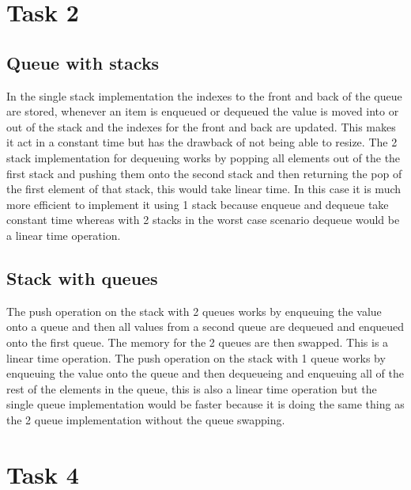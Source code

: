 \documentclass{article}
\begin{document}
\section{Task 2}

\subsection{Queue with stacks}

In the single stack implementation the indexes to the front and back of the queue are stored, whenever an item is enqueued or dequeued the value is moved into or out of the stack and the indexes for the front and back are updated. This makes it act in a constant time but has the drawback of not being able to resize. 
The 2 stack implementation for dequeuing works by popping all elements out of the the first stack and pushing them onto the second stack and then returning the pop of the first element of that stack, this would take linear time. 
In this case it is much more efficient to implement it using 1 stack because enqueue and dequeue take constant time whereas with 2 stacks in the worst case scenario dequeue would be a linear time operation. 

\subsection{Stack with queues}

The push operation on the stack with 2 queues works by enqueuing the value onto a queue and then all values from a second queue are dequeued and enqueued onto the first queue. The memory for the 2 queues are then swapped. This is a linear time operation. The push operation on the stack with 1 queue works by enqueuing the value onto the queue and then dequeueing and enqueuing all of the rest of the elements in the queue, this is also a linear time operation but the single queue implementation would be faster because it is doing the same thing as the 2 queue implementation without the queue swapping. 


\section{Task 4}
\end{document}

